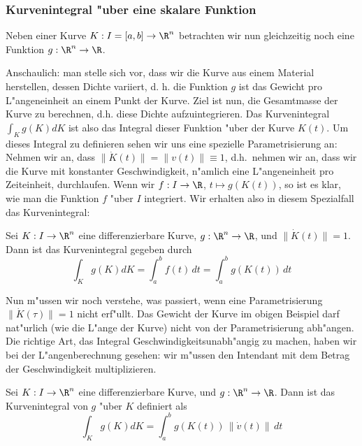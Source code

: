 \subsubsection{Kurvenintegral "uber eine skalare Funktion}
 
Neben einer Kurve $K:I=[a,b]\rightarrow\R^n$ betrachten wir nun gleichzeitig 
noch eine Funktion $g:\R^n\rightarrow \R$. 

Anschaulich: man stelle sich vor, dass wir die Kurve aus einem Material herstellen, 
dessen Dichte variiert, d. h. die Funktion $g$ ist das Gewicht pro L"angeneinheit an einem 
Punkt der Kurve. Ziel ist nun, die Gesamtmasse der Kurve zu berechnen, d.h. diese Dichte
aufzuintegrieren. Das Kurvenintegral $ \int_{K} g(K) dK$ ist also das Integral 
dieser Funktion "uber der Kurve $K(t)$. Um dieses Integral zu definieren sehen wir uns eine spezielle
Parametrisierung an: Nehmen wir an, dass $\|\dot K(t)\|=\|v(t)\|\equiv 1$, d.h.\ nehmen wir an, dass wir die Kurve mit konstanter Geschwindigkeit, 
n"amlich eine L"angeneinheit pro Zeiteinheit, durchlaufen. Wenn wir $f:I\rightarrow\R$, $t\mapsto g(K(t))$, so ist es klar, wie man die Funktion $f$ 
"uber $I$ integriert. Wir erhalten also in diesem Spezialfall das Kurvenintegral: 
\begin{sdefi} Sei $ K: I\rightarrow \R^n$ eine differenzierbare Kurve, $g:\R^n\rightarrow \R$, und $\|\dot K(t)\|=1$. Dann ist das Kurvenintegral gegeben durch
$$ \int_{K} g(K) dK = \int_a^b f(t)\, dt = \int_a^bg(K(t))\, dt
$$
\end{sdefi}
Nun m"ussen wir noch verstehe, was passiert, wenn eine Parametrisierung 
$\|\dot K(\tau)\|=1$ nicht erf"ullt. Das Gewicht der Kurve im obigen Beispiel 
darf nat"urlich (wie die L"ange der Kurve) nicht von der Parametrisierung abh"angen.
Die richtige Art, das Integral Geschwindigkeitsunabh"angig zu machen, haben wir 
bei der L"angenberechnung gesehen: wir m"ussen den Intendant mit dem Betrag der 
Geschwindigkeit multiplizieren.
\begin{sdefi} Sei $ K: I\rightarrow \R^n$ eine differenzierbare Kurve, und  $g:\R^n\rightarrow \R$. Dann ist das Kurvenintegral 
von $g$ "uber $K$ definiert als 
$$ \int_{K} g(K) dK  = \int_a^bg(K(t))\,\|\dot v(t)\|\, dt
$$
\end{sdefi}
